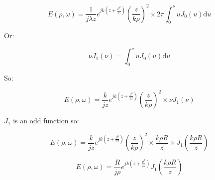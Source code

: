 \documentclass[10pt,a4paper]{article}
\begin{document}
\[
E(\rho,\omega)=\frac{1}{j\lambda z} e^{jk\left(z+\frac{\rho^2}{2z}\right)}
\left(\frac{z}{k\rho}\right)^2
\times 2\pi \int_0^\nu u J_0(u) \mathrm{d}u
\]

Or:

\[\nu J_1(\nu)=\int_0^\nu u J_0(u) \mathrm{d}u\]

So:

\[
E(\rho,\omega)=\frac{k}{jz} e^{jk\left(z+\frac{\rho^2}{2z}\right)}
\left(\frac{z}{k\rho}\right)^2
\times \nu J_1(\nu)
\]

$J_1$ is an odd function so:

\[
E(\rho,\omega)=\frac{k}{jz} e^{jk\left(z+\frac{\rho^2}{2z}\right)}
\left(\frac{z}{k\rho}\right)^2
\times \frac{k\rho R}{z} \times J_1\left(\frac{k\rho R}{z}\right)
\]

\[
E(\rho,\omega)=\frac{R}{j\rho} e^{jk\left(z+\frac{\rho^2}{2z}\right)}
J_1\left(\frac{k\rho R}{z}\right)
\]
\end{document}

